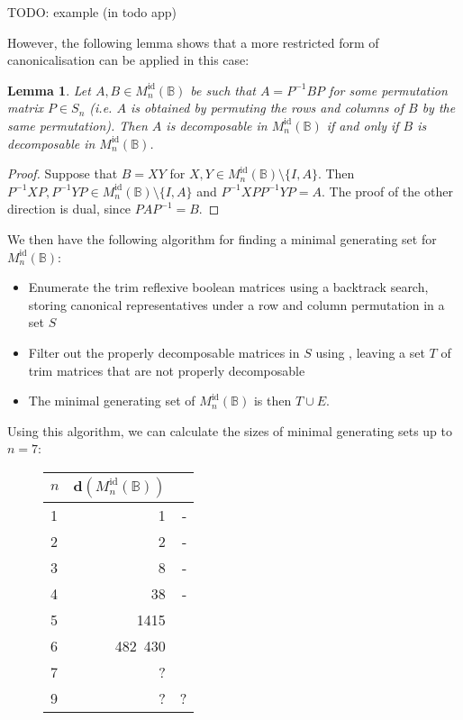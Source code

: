 \documentclass[11pt]{article}
\newtheorem{lemma}[thm]{Lemma}
\numberwithin{equation}{section}
\newcommand{\B}{\mathbb{B}}
\newcommand{\Refn}{M_n^{\text{id}}(\B)}
\newcommand{\cmark}{\ding{51}}
\begin{document}
TODO: example (in todo app)

However, the following lemma shows that a more restricted form of
canonicalisation can be applied in this case:

\begin{lemma}
  Let $A, B \in \Refn$ be such that $A = P^{-1} B P$ for some permutation matrix
  $P \in S_n$ (i.e. $A$ is obtained by permuting the rows and columns of $B$ by
  the same permutation). Then $A$ is decomposable in $\Refn$ if and only if $B$
  is decomposable in $\Refn$.
\end{lemma}
\begin{proof}
  Suppose that $B = XY$ for $X, Y \in \Refn\setminus \{I, A\}$. Then $P^{-1}XP,
  P^{-1}YP \in \Refn\setminus\{I, A\}$ and $P^{-1}XPP^{-1}YP = A$. The proof of
  the other direction is dual, since $PAP^{-1} = B$.
\end{proof}

We then have the following algorithm for finding a minimal generating set for
$\Refn$:
\begin{itemize}
  \item
    Enumerate the trim reflexive boolean matrices using a backtrack search,
    storing canonical representatives under a row and column permutation in a
    set $S$
  \item 
    Filter out the properly decomposable matrices in $S$ using
    , leaving a set $T$ of trim matrices that
    are not properly decomposable
  \item
    The minimal generating set of $\Refn$ is then $T \cup E$.
\end{itemize}
Using this algorithm, we can calculate the sizes of minimal generating sets up
to $n = 7$:

\begin{figure}
  \label{fig:reflexiverank}
  \centering
  \begin{tabular}{l|r|r}
    $n$ & $\mathbf{d}(\Refn)$ &   \\
    \hline
    1 & 1          & - \\ 
    2 & 2          & - \\ 
    3 & 8          & - \\ 
    4 & 38         & - \\
    5 & 1415       & \cmark \\
    6 & 482\ 430   & \cmark \\ 
    7 & ?          & \cmark \\
    9 & ?          & ?
  \end{tabular}
\end{figure}
\printbibliography
\end{document}
